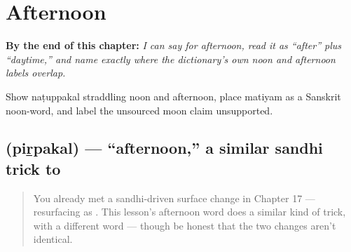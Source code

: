 
\chapter{Afternoon}
\label{ch:ta-afternoon}

\begin{chapteropening}
\textbf{By the end of this chapter:} \emph{I can say  for afternoon, read it as \textquotedblleft{}after\textquotedblright{} plus \textquotedblleft{}daytime,\textquotedblright{} and name exactly where the dictionary's own noon and afternoon labels overlap.}

Show naṭuppakal straddling noon and afternoon, place matiyam as a Sanskrit noon-word, and label the unsourced moon claim unsupported.
\end{chapteropening}

\section[\texorpdfstring{\ta{பிற்பகல்} (piṟpakal)}{பிற்பகல் (piṟpakal)}]{ (piṟpakal) — \textquotedblleft{}afternoon,\textquotedblright{} a similar sandhi trick to }

\label{lesson:TA-C28-pirpakal}



\begin{quote}
You already met a sandhi-driven surface change in Chapter 17 —  resurfacing as . This lesson's afternoon word does a similar kind of trick, with a different word — though be honest that the two changes aren't identical.
\end{quote}

